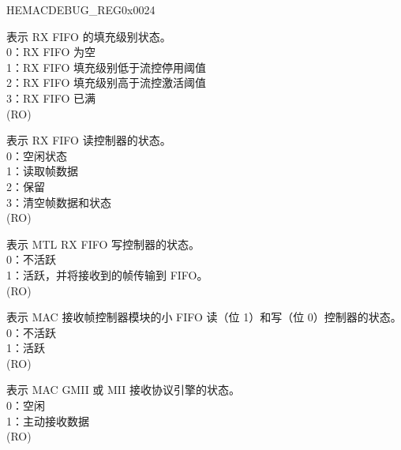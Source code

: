 \addtocounter{Regfloat}{-1}
\begin{register}{H}{EMACDEBUG\_REG}{0x0024}
\begin{regdesc}\begin{reglist}
\item[接上页...]

\item [MTLRFFLS] 表示 RX FIFO 的填充级别状态。\\
0：RX FIFO 为空\\
1：RX FIFO 填充级别低于流控停用阈值\\
2：RX FIFO 填充级别高于流控激活阈值\\
3：RX FIFO 已满\\
(RO)
\item [MTLRFRCS] 表示 RX FIFO 读控制器的状态。\\
0：空闲状态\\
1：读取帧数据\\
2：保留\\
3：清空帧数据和状态\\
(RO)
\item [MTLRFWCAS] 表示 MTL RX FIFO 写控制器的状态。\\
0：不活跃\\
1：活跃，并将接收到的帧传输到 FIFO。\\(RO)
\item [MACRFFCS] 表示 MAC 接收帧控制器模块的小 FIFO 读（位 1）和写（位 0）控制器的状态。\\
0：不活跃\\
1：活跃\\(RO)
\item [MACRPES] 表示 MAC GMII 或 MII 接收协议引擎的状态。\\
0：空闲\\
1：主动接收数据\\(RO)
\end{reglist}\end{regdesc}
\end{register}


